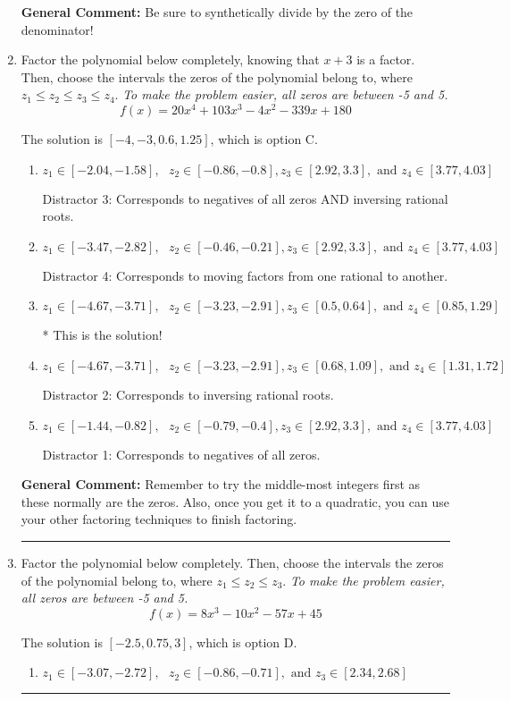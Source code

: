 \documentclass{extbook}[14pt]
\newcommand{\litem}[1]{\item #1

\rule{\textwidth}{0.4pt}}
\begin{document}
\begin{enumerate}
{\textbf{General Comment:} Be sure to synthetically divide by the zero of the denominator!
}
\litem{
Factor the polynomial below completely, knowing that $x+3$ is a factor. Then, choose the intervals the zeros of the polynomial belong to, where $z_1 \leq z_2 \leq z_3 \leq z_4$. \textit{To make the problem easier, all zeros are between -5 and 5.}
\[ f(x) = 20x^{4} +103 x^{3} -4 x^{2} -339 x + 180 \]

The solution is \( [-4, -3, 0.6, 1.25] \), which is option C.\begin{enumerate}[label=\Alph*.]
\item \( z_1 \in [-2.04, -1.58], \text{   }  z_2 \in [-0.86, -0.8], z_3 \in [2.92, 3.3], \text{   and   } z_4 \in [3.77, 4.03] \)

 Distractor 3: Corresponds to negatives of all zeros AND inversing rational roots.
\item \( z_1 \in [-3.47, -2.82], \text{   }  z_2 \in [-0.46, -0.21], z_3 \in [2.92, 3.3], \text{   and   } z_4 \in [3.77, 4.03] \)

 Distractor 4: Corresponds to moving factors from one rational to another.
\item \( z_1 \in [-4.67, -3.71], \text{   }  z_2 \in [-3.23, -2.91], z_3 \in [0.5, 0.64], \text{   and   } z_4 \in [0.85, 1.29] \)

* This is the solution!
\item \( z_1 \in [-4.67, -3.71], \text{   }  z_2 \in [-3.23, -2.91], z_3 \in [0.68, 1.09], \text{   and   } z_4 \in [1.31, 1.72] \)

 Distractor 2: Corresponds to inversing rational roots.
\item \( z_1 \in [-1.44, -0.82], \text{   }  z_2 \in [-0.79, -0.4], z_3 \in [2.92, 3.3], \text{   and   } z_4 \in [3.77, 4.03] \)

 Distractor 1: Corresponds to negatives of all zeros.
\end{enumerate}

\textbf{General Comment:} Remember to try the middle-most integers first as these normally are the zeros. Also, once you get it to a quadratic, you can use your other factoring techniques to finish factoring.
}
\litem{
Factor the polynomial below completely. Then, choose the intervals the zeros of the polynomial belong to, where $z_1 \leq z_2 \leq z_3$. \textit{To make the problem easier, all zeros are between -5 and 5.}
\[ f(x) = 8x^{3} -10 x^{2} -57 x + 45 \]

The solution is \( [-2.5, 0.75, 3] \), which is option D.\begin{enumerate}[label=\Alph*.]
\item \( z_1 \in [-3.07, -2.72], \text{   }  z_2 \in [-0.86, -0.71], \text{   and   } z_3 \in [2.34, 2.68] \)


\end{enumerate}}
\end{enumerate}
\end{document}
